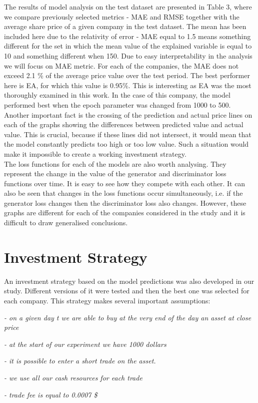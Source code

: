 \documentclass[11pt]{article} %
\begin{document}
The results of model analysis on the test dataset are presented in Table 3, where we compare previously selected metrics - MAE and RMSE together with the average share price of a given company in the test dataset. The mean has been included here due to the relativity of error - MAE equal to 1.5 means something different for the set in which the mean value of the explained variable is equal to 10 and something different when 150. Due to easy interpretability in the analysis we will focus on MAE metric. For each of the companies, the MAE does not exceed 2.1 \% of the average price value over the test period. The best performer here is EA, for which this value is 0.95\%. This is interesting as EA was the most thoroughly examined in this work. In the case of this company, the model performed best when the epoch parameter was changed from 1000 to 500. Another important fact is the crossing of the prediction and actual price lines on each of the graphs showing the differences between predicted value and actual value. This is crucial, because if these lines did not intersect, it would mean that the model constantly predicts too high or too low value. Such a situation would make it impossible to create a working investment strategy. \\
The loss functions for each of the models are also worth analysing. They represent the change in the value of the generator and discriminator loss functions over time. It is easy to see how they compete with each other. It can also be seen that changes in the loss functions occur simultaneously, i.e. if the generator loss changes then the discriminator loss also changes. However, these graphs are different for each of the companies considered in the study and it is difficult to draw generalised conclusions. 


\section{Investment Strategy}

An investment strategy based on the model predictions was also developed in our study. Different versions of it were tested and then the best one was selected for each company. This strategy makes several important assumptions: 
 \begin{flushleft}\textit{- on a given day t we are able to buy at the very end of the day an asset at close price} \end{flushleft}
 \begin{flushleft}\textit{- at the start of our experiment we have 1000 dollars}  \end{flushleft}
 \begin{flushleft}\textit{- it is possible to enter a short trade on the asset.} \end{flushleft}
\begin{flushleft}\textit{- we use all our cash resources for each trade } \end{flushleft}
\begin{flushleft}\textit{- trade fee is equal to 0.0007 \$ } \end{flushleft}
\end{document}
